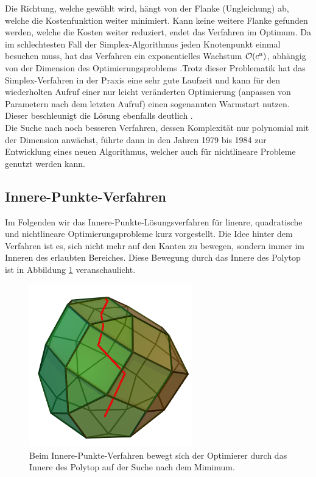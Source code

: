 \documentclass{like}
\begin{document}
Die Richtung, welche gewählt wird, hängt von der Flanke (Ungleichung) ab, welche die Kostenfunktion weiter minimiert. Kann keine weitere Flanke gefunden werden, welche die Kosten weiter reduziert, endet das Verfahren im Optimum. Da im schlechtesten Fall der Simplex-Algorithmus jeden Knotenpunkt einmal besuchen muss, hat das Verfahren ein exponentielles Wachstum $\mathcal{O}(c\textsuperscript{n})$, abhängig von der Dimension des Optimierungsproblems \cite{doi:10.1137/S0036144502414942}.Trotz dieser Problematik hat das Simplex-Verfahren in der Praxis eine sehr gute Laufzeit und kann für den wiederholten Aufruf einer nur leicht veränderten Optimierung (anpassen von Parametern nach dem letzten Aufruf) einen sogenannten Warmstart nutzen. Dieser beschleunigt die Lösung ebenfalls deutlich \cite{simplexWiki:1}.\\
Die Suche nach noch besseren Verfahren, dessen Komplexität nur polynomial mit der Dimension anwächst, führte dann in den Jahren 1979 bis 1984 zur Entwicklung eines neuen Algorithmus, welcher auch für nichtlineare Probleme genutzt werden kann.

\subsection{Innere-Punkte-Verfahren} 
\label{ipm} 
Im Folgenden wir das Innere-Punkte-Lösungsverfahren für lineare, quadratische und nichtlineare Optimierungsprobleme kurz vorgestellt. Die Idee hinter dem Verfahren ist es, sich nicht mehr auf den Kanten zu bewegen, sondern immer im Inneren des erlaubten Bereiches. Diese Bewegung durch das Innere des Polytop ist in Abbildung \ref{fig:iterPointMethod} veranschaulicht.  
\begin{figure}[ht!]
	\centering
	\includegraphics[width=200pt]{Abbildungen/iterPointMethod.png}
	\caption{Beim Innere-Punkte-Verfahren bewegt sich der Optimierer durch das Innere des Polytop auf der Suche nach dem Mimimum.}
	\label{fig:iterPointMethod}
\end{figure}
\end{document}
